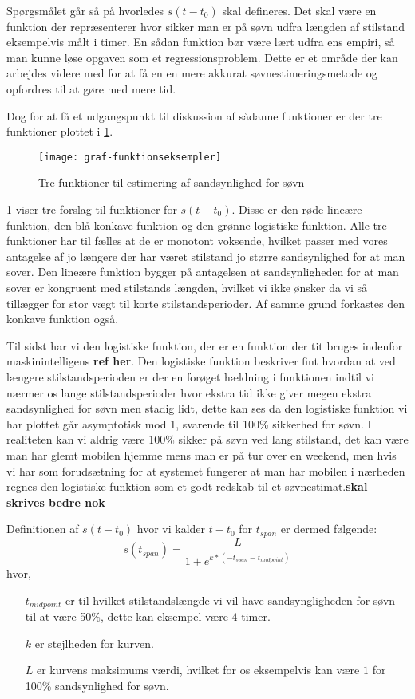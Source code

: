Spørgsmålet går så på hvorledes $s(t-t_0)$ skal defineres.
Det skal være en funktion der repræsenterer hvor sikker man er på søvn udfra længden af stilstand eksempelvis målt i timer.
En sådan funktion bør være lært udfra ens empiri, så man kunne løse opgaven som et regressionsproblem.
Dette er et område der kan arbejdes videre med for at få en en mere akkurat søvnestimeringsmetode og opfordres til at gøre med mere tid.

Dog for at få et udgangspunkt til diskussion af sådanne funktioner er der tre funktioner plottet i \cref{fig:trefunc}.
\begin{figure}[h]
	\centering
	\texttt{[image: graf-funktionseksempler]}
	\caption{Tre funktioner til estimering af sandsynlighed for søvn}\label{fig:trefunc}
\end{figure}

\cref{fig:trefunc} viser tre forslag til funktioner for $s(t-t_0)$.
Disse er den røde lineære funktion, den blå konkave funktion og den grønne logistiske funktion.
Alle tre funktioner har til fælles at de er monotont voksende, hvilket passer med vores antagelse af jo længere der har været stilstand jo større sandsynlighed for at man sover.
Den lineære funktion bygger på antagelsen at sandsynligheden for at man sover er kongruent med stilstands længden, hvilket vi ikke ønsker da vi så tillægger for stor vægt til korte stilstandsperioder.
Af samme grund forkastes den konkave funktion også.

Til sidst har vi den logistiske funktion, der er en funktion der tit bruges indenfor maskinintelligens \textbf{ref her}.
Den logistiske funktion beskriver fint hvordan at ved længere stilstandsperioden er der en forøget hældning i funktionen indtil vi nærmer os lange stilstandsperioder hvor ekstra tid ikke giver megen ekstra sandsynlighed for søvn men stadig lidt, dette kan ses da den logistiske funktion vi har plottet går asymptotisk mod 1, svarende til 100\% sikkerhed for søvn.
I realiteten kan vi aldrig være 100\% sikker på søvn ved lang stilstand, det kan være man har glemt mobilen hjemme mens man er på tur over en weekend, men hvis vi har som forudsætning for at systemet fungerer at man har mobilen i nærheden regnes den logistiske funktion som et godt redskab til et søvnestimat.\textbf{skal skrives bedre nok}

Definitionen af $s(t-t_0)$ hvor vi kalder $t-t_0$ for $t_{span}$ er dermed følgende:
\begin{equation}
	s(t_{span}) = \frac{L}{1+e^{k*(-t_{span} - t_{midpoint})}}
\end{equation} 
hvor,
\begin{itemize}
	\item[$t_{midpoint}$] er til hvilket stilstandslængde vi vil have sandsyngligheden for søvn til at være 50\%, dette kan eksempel være $4$ timer.
	\item[$k$] er stejlheden for kurven.
	\item[$L$] er kurvens maksimums værdi, hvilket for os eksempelvis kan være $1$ for 100\% sandsynlighed for søvn.
\end{itemize}

